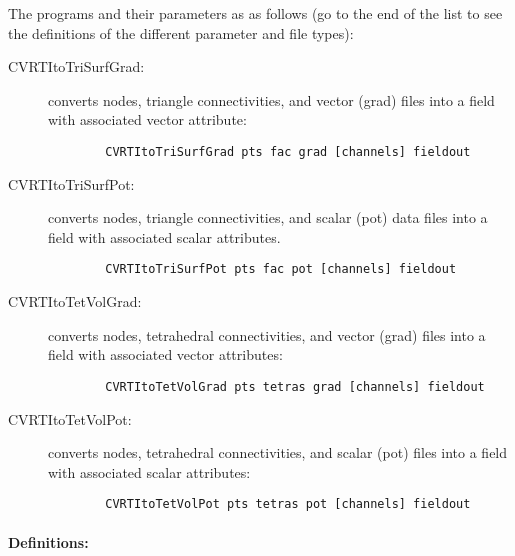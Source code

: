 The programs and their parameters as as follows (go to the end of the list
to see the definitions of the different parameter and file types):
%
\begin{description}
  \item [CVRTItoTriSurfGrad: ] converts nodes, triangle connectivities, and
        vector (grad) files into a field with associated vector attribute:\\
        \begin{verbatim}
        CVRTItoTriSurfGrad pts fac grad [channels] fieldout
        \end{verbatim}
  \item [CVRTItoTriSurfPot: ] converts nodes, triangle connectivities, and
        scalar (pot) data files into a field with associated scalar
        attributes. 
        \begin{verbatim}
        CVRTItoTriSurfPot pts fac pot [channels] fieldout
        \end{verbatim}
  \item [CVRTItoTetVolGrad: ] converts nodes, tetrahedral connectivities, and
        vector (grad) files into a field with associated vector
        attributes:\\
        \begin{verbatim}
        CVRTItoTetVolGrad pts tetras grad [channels] fieldout
        \end{verbatim}
  \item [CVRTItoTetVolPot: ] converts nodes, tetrahedral connectivities, and
        scalar (pot) files into a field with associated scalar attributes:\\
        \begin{verbatim}
        CVRTItoTetVolPot pts tetras pot [channels] fieldout
        \end{verbatim}
\end{description}

\paragraph{Definitions:}

